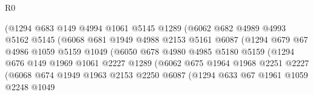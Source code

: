 \begin{lexlean}{R0}
\begin{coremodule}
                            (@1294
                              @683
                              @149
                              @4994
                              @1061
                              @5145
                              @1289
                              (@6062
                                @682
                                @4989
                                @4993
                                @5162
                                @5145
                                (@6068
                                  @681
                                  @1949
                                  @4988
                                  @2153
                                  @5161
                                  @6087
                                  (@1294
                                    @679
                                    @67
                                    @4986
                                    @1059
                                    @5159
                                    @1049
                                    (@6050
                                      @678
                                      @4980
                                      @4985
                                      @5180
                                      @5159
                                      (@1294
                                        @676
                                        @149
                                        @1969
                                        @1061
                                        @2227
                                        @1289
                                        (@6062
                                          @675
                                          @1964
                                          @1968
                                          @2251
                                          @2227
                                          (@6068
                                            @674
                                            @1949
                                            @1963
                                            @2153
                                            @2250
                                            @6087
                                            (@1294
                                              @633
                                              @67
                                              @1961
                                              @1059
                                              @2248
                                              @1049

\end{coremodule}
\end{lexlean}
